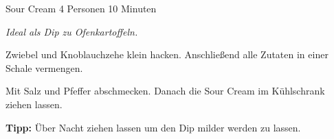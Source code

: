 \begin{recipe}{Sour Cream} {4 Personen} {10 Minuten}

\freeform
\textit{Ideal als Dip zu Ofenkartoffeln.}


Zwiebel und Knoblauchzehe klein hacken.
Anschließend alle Zutaten in einer Schale vermengen.

Mit Salz und Pfeffer abschmecken.
Danach die Sour Cream im Kühlschrank ziehen lassen.

\freeform
\hrulefill

\freeform 
\textbf{Tipp:}
Über Nacht ziehen lassen um den Dip milder werden zu lassen.

\end{recipe}

